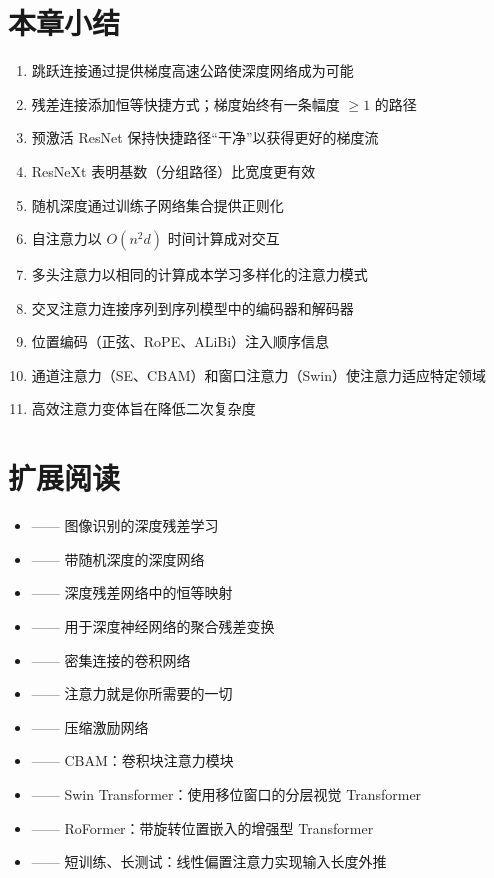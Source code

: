 \section{本章小结}

\begin{enumerate}
    \item 跳跃连接通过提供梯度高速公路使深度网络成为可能
    \item 残差连接添加恒等快捷方式；梯度始终有一条幅度 $\geq 1$ 的路径
    \item 预激活 ResNet 保持快捷路径``干净''以获得更好的梯度流
    \item ResNeXt 表明基数（分组路径）比宽度更有效
    \item 随机深度通过训练子网络集合提供正则化
    \item 自注意力以 $O(n^2 d)$ 时间计算成对交互
    \item 多头注意力以相同的计算成本学习多样化的注意力模式
    \item 交叉注意力连接序列到序列模型中的编码器和解码器
    \item 位置编码（正弦、RoPE、ALiBi）注入顺序信息
    \item 通道注意力（SE、CBAM）和窗口注意力（Swin）使注意力适应特定领域
    \item 高效注意力变体旨在降低二次复杂度
\end{enumerate}

\section{扩展阅读}

\begin{itemize}
    \item \cite{he2016deep} —— 图像识别的深度残差学习
    \item \cite{huang2016deep} —— 带随机深度的深度网络
    \item \cite{he2016identity} —— 深度残差网络中的恒等映射
    \item \cite{xie2017aggregated} —— 用于深度神经网络的聚合残差变换
    \item \cite{huang2017densely} —— 密集连接的卷积网络
    \item \cite{vaswani2017attention} —— 注意力就是你所需要的一切
    \item \cite{hu2018squeeze} —— 压缩激励网络
    \item \cite{woo2018cbam} —— CBAM：卷积块注意力模块
    \item \cite{liu2021swin} —— Swin Transformer：使用移位窗口的分层视觉 Transformer
    \item \cite{su2021roformer} —— RoFormer：带旋转位置嵌入的增强型 Transformer
    \item \cite{press2022train} —— 短训练、长测试：线性偏置注意力实现输入长度外推
\end{itemize}

